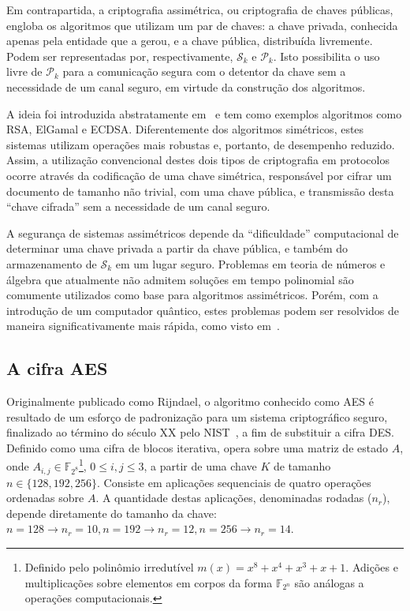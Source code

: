 \documentclass{ufsctex/ufsctex}
\newcommand{\pk}{\mathcal{P}_{k}}
\newcommand{\sk}{\mathcal{S}_{k}}
\begin{document}
Em contrapartida, a criptografia assimétrica, ou criptografia de chaves
públicas, engloba os algoritmos que utilizam um par de chaves: a chave privada,
conhecida apenas pela entidade que a gerou, e a chave pública, distribuída
livremente. Podem ser representadas por, respectivamente, $\sk{}$ e $\pk{}$.
Isto possibilita o uso livre de $\pk{}$ para a comunicação segura com o
detentor da chave sem a necessidade de um canal seguro, em virtude da
construção dos algoritmos.

A ideia foi introduzida abstratamente em~\cite{Diffie:article:1976:sep} e tem
como exemplos algoritmos como RSA, ElGamal e ECDSA. Diferentemente dos algoritmos simétricos,
estes sistemas utilizam operações mais robustas e, portanto, de desempenho
reduzido. Assim, a utilização convencional destes dois tipos de criptografia em
protocolos ocorre através da codificação de uma chave simétrica, responsável
por cifrar um documento de tamanho não trivial, com uma chave pública, e
transmissão desta ``chave cifrada'' sem a necessidade de um canal seguro.

A segurança de sistemas assimétricos depende da ``dificuldade'' computacional
de determinar uma chave privada a partir da chave pública, e também do
armazenamento de $\sk{}$ em um lugar seguro. Problemas em teoria de números e
álgebra que atualmente não admitem soluções em tempo polinomial são comumente
utilizados como base para algoritmos assimétricos. Porém, com a introdução de
um computador quântico, estes problemas podem ser resolvidos de maneira
significativamente mais rápida, como visto em~\cite{Shor:article:1997:oct}.

\subsection{A cifra AES}\label{subsection:aes}

Originalmente publicado como Rijndael, o algoritmo conhecido como
AES é resultado de um esforço
de padronização para um sistema criptográfico seguro, finalizado ao término do
século XX pelo NIST~\cite{Dworkin:report:2001:nov}, a fim de substituir a cifra
DES. Definido como uma cifra de
blocos iterativa, opera sobre uma matriz de estado $A$, onde $A_{i, j} \in
\mathbb{F}_{2^{8}}$\footnote{Definido pelo polinômio irredutível $m(x) = x^{8} + x^{4} + x^{3}
+ x + 1$. Adições e multiplicações sobre elementos em corpos da forma
$\mathbb{F}_{2^{n}}$ são análogas a operações computacionais.}, $0 \leq i, j
\leq 3$, a partir de uma chave $K$ de tamanho $n \in \{128, 192, 256\}$.
Consiste em aplicações sequenciais de quatro operações ordenadas sobre $A$. A
quantidade destas aplicações, denominadas rodadas ($n_{r}$), depende
diretamente do tamanho da chave: $n = 128 \rightarrow n_{r} = 10, n = 192
\rightarrow n_{r} = 12, n = 256 \rightarrow n_{r} = 14$.
\end{document}
